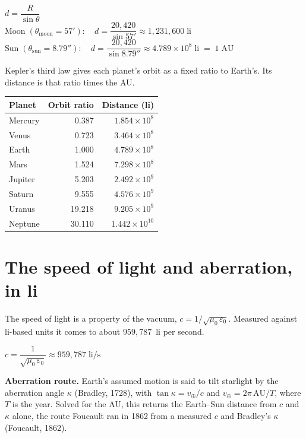 \documentclass[11pt]{article}
\begin{document}
\begin{tcolorbox}[mathbox]
$d = \dfrac{R}{\sin\theta}$
\\[12pt]
$\text{Moon}\;(\theta_{\text{moon}} = 57'):\quad
 d = \dfrac{20{,}420}{\sin 57'} \approx 1{,}231{,}600\;\text{li}$
\\[14pt]
$\text{Sun}\;(\theta_{\text{sun}} = 8.79''):\quad
 d = \dfrac{20{,}420}{\sin 8.79''} \approx 4.789\times10^{8}\;\text{li}
 \;=\; 1\;\text{AU}$
\end{tcolorbox}

\noindent
Kepler's third law gives each planet's orbit as a fixed ratio to Earth's.
Its distance is that ratio times the AU.

\begin{center}
\renewcommand{\arraystretch}{1.15}
\begin{tabular}{l r r}
\textbf{Planet} & \textbf{Orbit ratio} & \textbf{Distance (li)}\\
\hline
Mercury &  0.387 & $1.854\times10^{8}$\\
Venus   &  0.723 & $3.464\times10^{8}$\\
Earth   &  1.000 & $4.789\times10^{8}$\\
Mars    &  1.524 & $7.298\times10^{8}$\\
Jupiter &  5.203 & $2.492\times10^{9}$\\
Saturn  &  9.555 & $4.576\times10^{9}$\\
Uranus  & 19.218 & $9.205\times10^{9}$\\
Neptune & 30.110 & $1.442\times10^{10}$\\
\hline
\end{tabular}
\end{center}

\section{The speed of light and aberration, in li}

The speed of light is a property of the vacuum, $c = 1/\sqrt{\mu_0\,\varepsilon_0}$.
Measured against li-based units it comes to about $959{,}787$~li per second.

\begin{tcolorbox}[mathbox]
$c = \dfrac{1}{\sqrt{\mu_0\,\varepsilon_0}} \approx 959{,}787\;\text{li/s}$
\end{tcolorbox}

\noindent
\textbf{Aberration route.} Earth's assumed motion is said to tilt starlight
by the aberration angle $\kappa$ (Bradley, 1728), with
$\tan\kappa = v_\oplus/c$ and $v_\oplus = 2\pi\,\text{AU}/T$, where $T$ is the
year. Solved for the AU, this returns the Earth--Sun distance from $c$ and
$\kappa$ alone, the route Foucault ran in 1862 from a measured $c$ and
Bradley's $\kappa$ (Foucault, 1862).
\end{document}
